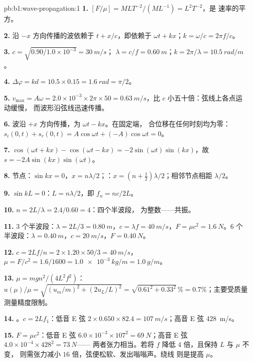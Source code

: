 \begin{solution}{pb:b1:wave-propagation:1}
\textbf{1.} $[F/\mu] = M L T^{-2}/(M L^{-1}) = L^2 T^{-2}$，是
速率的平方。

\textbf{2.} 沿 $-x$ 方向传播的波依赖于 $t + x/c$，即依赖于
$\omega t + kx$；$k = \omega/c = 2\pi f/c$。

\textbf{3.} $c = \sqrt{0.90/1.0\times10^{-3}} = \qty{30}{m/s}$；
$\lambda = c/f = \qty{0.60}{m}$；$k = 2\pi/\lambda = \qty{10.5}{rad/m}$。

\textbf{4.} $\Delta\varphi = kd = 10.5 \times 0.15 = \qty{1.6}{rad} = \pi/2$。

\textbf{5.} $v_{\max} = A\omega = 2.0\times10^{-3} \times 2\pi \times 50 =
\qty{0.63}{m/s}$，比 $c$ 小五十倍：弦线上各点运动缓慢，
而波形沿弦线迅速传播。

\textbf{6.} 波沿 $+x$ 方向传播，为 $\omega t - kx$。在固定端，
合位移在任何时刻均为零：$s_i(0, t) + s_r(0, t)
= A\cos\omega t + (-A)\cos\omega t = 0$。

\textbf{7.} $\cos(\omega t + kx) - \cos(\omega t - kx) =
-2\sin(\omega t)\sin(kx)$，故 $s = -2A\sin(kx)\sin(\omega t)$。

\textbf{8.} 节点：$\sin kx = 0$，$x = n\lambda/2$；：$x = (n +
\tfrac12)\lambda/2$；相邻节点相距 $\lambda/2$。

\textbf{9.} $\sin kL = 0$：$L = n\lambda/2$，即 $f_n = nc/2L$。

\textbf{10.} $n = 2L/\lambda = 2.4/0.60 = 4$：四个半波段，
为整数——共振。

\textbf{11.} $3$ 个半波段：$\lambda = 2L/3 = \qty{0.80}{m}$，$c = \lambda f
= \qty{40}{m/s}$，$F = \mu c^2 = \qty{1.6}{N}$。$6$ 个半波段：$\lambda =
\qty{0.40}{m}$，$c = \qty{20}{m/s}$，$F = \qty{0.40}{N}$。

\textbf{12.} $c = 2Lf/n = 2 \times 1.20 \times 50/3 = \qty{40}{m/s}$，
$\mu = F/c^2 = 1.6/1600 = \qty{1.0e-3}{kg/m} = \qty{1.0}{g/m}$。

\textbf{13.} $\mu = mgn^2/(4L^2f^2)$：$u(\mu)/\mu = \sqrt{(u_m/m)^2 +
(2u_L/L)^2} = \sqrt{0.61^2 + 0.33^2}\,\% = 0.7\%$；主要受质量测量精度限制。

\textbf{14.} 。$c = 2Lf_1$：低音 E 弦 $2 \times 0.650 \times
82.4 = \qty{107}{m/s}$；高音 E 弦 \qty{428}{m/s}。

\textbf{15.} $F = \mu c^2$：低音 E 弦 $6.0\times10^{-3} \times 107^2 =
\qty{69}{N}$；高音 E 弦 $4.0\times10^{-4} \times 428^2 = \qty{73}{N}$——
两者张力相当。若将 $f$ 降低 $4$ 倍，且保持 $L$ 与 $\mu$ 不变，
则需张力减小 $16$ 倍，弦便松软、发出嗡嗡声。绕线
则是提高 $\mu$。


\end{solution}
